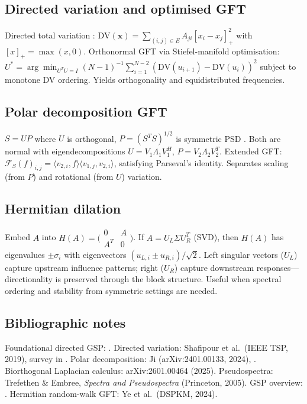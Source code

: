 \documentclass[11pt,a4paper]{article}
\theoremstyle{definition}
\newcommand{\bx}{\bm{x}}
\begin{document}
\begin{appendices}
\subsection{Directed variation and optimised GFT}
Directed total variation \citep{marques2020signal}: $\mathrm{DV}(\bx) = \sum_{(i,j) \in E} A_{ji}[x_i - x_j]_+^2$ with $[x]_+ = \max(x,0)$. Orthonormal GFT via Stiefel-manifold optimisation:
$U^* = \arg\min_{U^TU=I} (N{-}1)^{-1}\sum_{i=1}^{N-2}(\mathrm{DV}(u_{i+1}) - \mathrm{DV}(u_i))^2$ subject to monotone DV ordering. Yields orthogonality and equidistributed frequencies.

\subsection{Polar decomposition GFT}
$S = UP$ where $U$ is orthogonal, $P = (S^TS)^{1/2}$ is symmetric PSD \citep{kwak2024polar}. Both are normal with eigendecompositions $U = V_1\Lambda_1 V_1^H$, $P = V_2\Lambda_2 V_2^T$. Extended GFT: $\mathcal{F}_S(f)_{i,j} = \langle v_{2,i}, f\rangle\langle v_{1,j}, v_{2,i}\rangle$, satisfying Parseval's identity. Separates scaling (from $P$) and rotational (from $U$) variation.

\subsection{Hermitian dilation}
Embed $A$ into $H(A) = \bigl(\begin{smallmatrix} 0 & A \\ A^T & 0 \end{smallmatrix}\bigr)$. If $A = U_L \Sigma U_R^T$ (SVD), then $H(A)$ has eigenvalues $\pm\sigma_i$ with eigenvectors $(u_{L,i} \pm u_{R,i})/\sqrt{2}$. Left singular vectors ($U_L$) capture upstream influence patterns; right ($U_R$) capture downstream responses---directionality is preserved through the block structure. Useful when spectral ordering and stability from symmetric settings are needed.

\subsection{Bibliographic notes}
Foundational directed GSP: \citet{sandryhaila2013discrete,sandryhaila2014discrete}. Directed variation: Shafipour et al.\ (IEEE TSP, 2019), survey in \citet{marques2020signal}. Polar decomposition: Ji (arXiv:2401.00133, 2024), \citet{kwak2024polar}. Biorthogonal Laplacian calculus: arXiv:2601.00464 (2025). Pseudospectra: Trefethen \& Embree, \emph{Spectra and Pseudospectra} (Princeton, 2005). GSP overview: \citet{ortega2018graph}. Hermitian random-walk GFT: Ye et al.\ (DSPKM, 2024).



\end{appendices}
\end{document}
